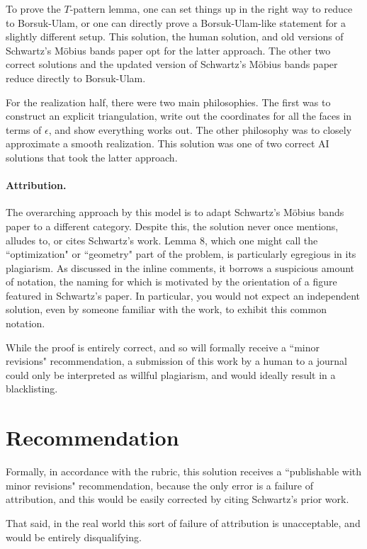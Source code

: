 \documentclass[12pt]{article}
\theoremstyle{plain}
\begin{document}
To prove the $T$-pattern lemma, one can set things up in the right way to reduce to Borsuk-Ulam, or one can directly prove a Borsuk-Ulam-like statement for a slightly different setup. This solution, the human solution, and old versions of Schwartz's M\"obius bands paper opt for the latter approach. The other two correct solutions and the updated version of Schwartz's M\"obius bands paper reduce directly to Borsuk-Ulam.

For the realization half, there were two main philosophies. The first was to construct an explicit triangulation, write out the coordinates for all the faces in terms of $\epsilon$, and show everything works out. The other philosophy was to closely approximate a smooth realization. This solution was one of two correct AI solutions that took the latter approach.

\paragraph{Attribution.}

The overarching approach by this model is to adapt Schwartz's M\"obius bands paper to a different category. Despite this, the solution never once mentions, alludes to, or cites Schwartz's work. Lemma 8, which one might call the ``optimization" or ``geometry" part of the problem, is particularly egregious in its plagiarism. As discussed in the inline comments, it borrows a suspicious amount of notation, the naming for which is motivated by the orientation of a figure featured in Schwartz's paper. In particular, you would not expect an independent solution, even by someone familiar with the work, to exhibit this common notation.

While the proof is entirely correct, and so will formally receive a ``minor revisions" recommendation, a submission of this work by a human to a journal could only be interpreted as willful plagiarism, and would ideally result in a blacklisting.

\section{Recommendation}

  Formally, in accordance with the rubric, this solution receives a ``publishable with minor revisions" recommendation, because the only error is a failure of attribution, and this would be easily corrected by citing Schwartz's prior work.

  That said, in the real world this sort of failure of attribution is unacceptable, and would be entirely disqualifying.
\end{document}
